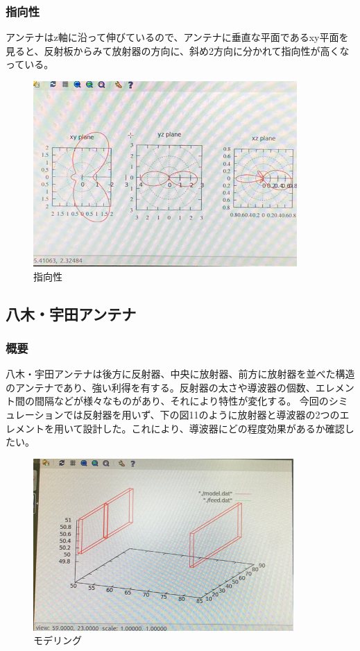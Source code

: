 \documentclass[dvipdfmx,autodetect-engine,titlepage]{jsarticle}
\begin{document}
\subsubsection{指向性}
アンテナはz軸に沿って伸びているので、アンテナに垂直な平面であるxy平面を見ると、反射板からみて放射器の方向に、斜め2方向に分かれて指向性が高くなっている。\\
\begin{figure}[H]
  \centering
  \includegraphics[scale=0.6]{i3.png}
  \caption{指向性}\label{fig:図12}
\end{figure}


\subsection{八木・宇田アンテナ}
\subsubsection{概要}
八木・宇田アンテナは後方に反射器、中央に放射器、前方に放射器を並べた構造のアンテナであり、強い利得を有する。反射器の太さや導波器の個数、エレメント間の間隔などが様々なものがあり、それにより特性が変化する。
今回のシミュレーションでは反射器を用いず、下の図11のように放射器と導波器の2つのエレメントを用いて設計した。これにより、導波器にどの程度効果があるか確認したい。\\
\begin{figure}[H]
  \centering
  \includegraphics[scale=0.6]{yagi1.png}
  \caption{モデリング}\label{fig:図13}
\end{figure}
\end{document}
